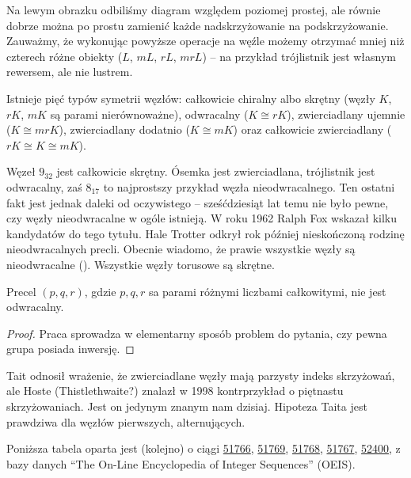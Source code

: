Na lewym obrazku odbiliśmy diagram względem poziomej prostej,
ale równie dobrze można po prostu zamienić każde nadskrzyżowanie na podskrzyżowanie.
Zauważmy, że wykonując powyższe operacje na węźle możemy otrzymać mniej niż czterech różne obiekty
($L$, $mL$, $rL$, $mrL$) -- na przykład trójlistnik jest własnym rewersem, ale nie lustrem.

\begin{definition}
    Istnieje pięć typów symetrii węzłów:
    całkowicie chiralny albo skrętny (węzły $K$, $rK$, $mK$ są parami nierównoważne),
    odwracalny ($K \cong rK$),
    zwierciadlany ujemnie ($K \cong mrK$),
    zwierciadlany dodatnio ($K \cong mK$) oraz
    całkowicie zwierciadlany ($rK \cong K \cong mK$).
\end{definition}

Węzeł $9_{32}$ jest całkowicie skrętny. 
Ósemka jest zwierciadlana, trójlistnik jest odwracalny,
zaś $8_{17}$ to najprostszy przykład węzła nieodwracalnego.
Ten ostatni fakt jest jednak daleki od oczywistego -- 
sześćdziesiąt lat temu nie było pewne,
czy węzły nieodwracalne w ogóle istnieją.
W roku 1962 Ralph Fox wskazał kilku kandydatów do tego tytułu.
Hale Trotter odkrył rok później nieskończoną rodzinę nieodwracalnych precli.
Obecnie wiadomo, że prawie wszystkie węzły są nieodwracalne (\cite[s.~46]{murasugi96}).
Wszystkie węzły torusowe są skrętne.

\begin{proposition}[Trotter, 1963] \label{trotter}
    Precel $(p, q, r)$, gdzie $p, q, r$ sa parami różnymi liczbami całkowitymi, nie jest odwracalny.
\end{proposition}

\begin{proof}
    Praca \cite{trotter63} sprowadza w elementarny sposób problem do pytania, czy pewna grupa posiada inwersję.
\end{proof}

Tait odnosił wrażenie, że zwierciadlane węzły mają parzysty indeks skrzyżowań,
ale Hoste (Thistlethwaite?) znalazł w 1998 kontrprzykład o piętnastu skrzyżowaniach.
Jest on jedynym znanym nam dzisiaj.
Hipoteza Taita jest prawdziwa dla węzłów pierwszych, alternujących.

Poniższa tabela oparta jest (kolejno) o ciągi 
\href{https://oeis.org/A051766}{51766}, 
\href{https://oeis.org/A051769}{51769}, 
\href{https://oeis.org/A051768}{51768}, 
\href{https://oeis.org/A051767}{51767}, 
\href{https://oeis.org/A052400}{52400}, 
z bazy danych ``The On-Line Encyclopedia of Integer Sequences'' (OEIS).

